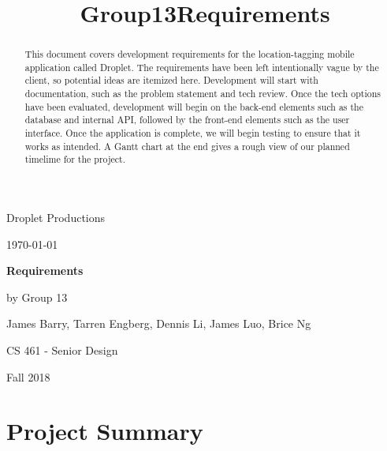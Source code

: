 \documentclass[draftclsnofoot, onecolumn,journal,letterpaper,10pt, compsoc]{IEEEtran}
\title{Group13Requirements}
\def \TitlePageHeader{Droplet Productions}
\def \TitlePageTitle{Requirements}
\def \GroupNumber{by Group 13}
\def \GroupMembers{James Barry, Tarren Engberg, Dennis Li, James Luo,  Brice Ng}
\def \CourseTitle{CS 461 - Senior Design}
\def \CourseTerm{Fall 2018}
\newcommand{\NameSigPair}[1]{\par
\makebox[2.75in][r]{#1} \hfil 	\makebox[3.25in]{\makebox[2.25in]{\hrulefill} \hfill		\makebox[.75in]{\hrulefill}}
\par\vspace{-12pt} \textit{\tiny\noindent
\makebox[2.75in]{} \hfil		\makebox[3.25in]{\makebox[2.25in][r]{Signature} \hfill	\makebox[.75in][r]{Date}}}}
\renewcommand{\NameSigPair}[1]{#1}
\begin{document}
\begin{titlepage}
    \begin{singlespace}
        \hfill    
        \par\vspace{.2in}
        \centering
        \scshape{
            \huge \TitlePageHeader \par
            {\large\today}\par
            \vspace{.5in}
            \textbf{\Huge \TitlePageTitle }\par
            \vfill
            \vspace{5pt}

            \vspace{5pt}
            {\Large
                \NameSigPair{\GroupNumber}\par
            	\NameSigPair{\GroupMembers}\par
                \NameSigPair{\CourseTitle}\par
                \NameSigPair{\CourseTerm}\par
            }
            \vspace{20pt}
        }
    \end{singlespace}
    \begin{abstract}
    This document covers development requirements for the location-tagging mobile application called Droplet. The requirements have been left intentionally vague by the client, so potential ideas are itemized here. Development will start with documentation, such as the problem statement and tech review. Once the tech options have been evaluated, development will begin on the back-end elements such as the database and internal API, followed by the front-end elements such as the user interface. Once the application is complete, we will begin testing to ensure that it works as intended. A Gantt chart at the end gives a rough view of our planned timelime for the project.
    \end{abstract}
\end{titlepage}

\newpage
{}
\clearpage

\pagebreak

\section{Project Summary}
\end{document}
